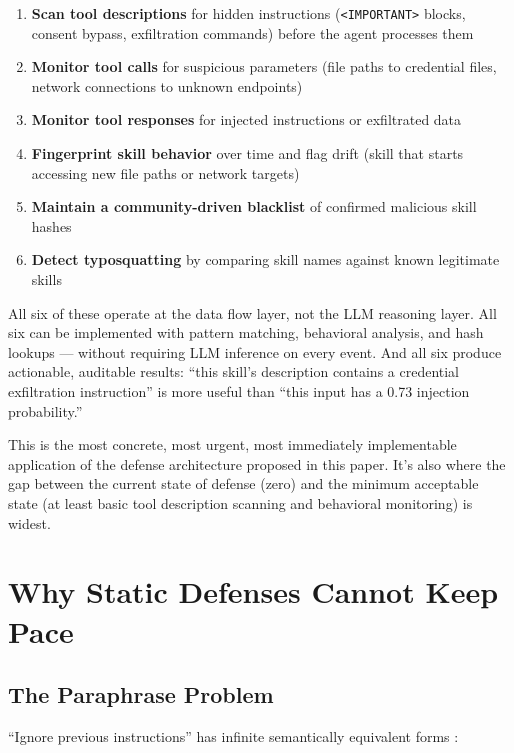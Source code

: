 \documentclass[11pt,letterpaper]{article}
\begin{document}
\begin{enumerate}
\item \textbf{Scan tool descriptions} for hidden instructions (\texttt{<IMPORTANT>} blocks, consent bypass, exfiltration commands) before the agent processes them
\item \textbf{Monitor tool calls} for suspicious parameters (file paths to credential files, network connections to unknown endpoints)
\item \textbf{Monitor tool responses} for injected instructions or exfiltrated data
\item \textbf{Fingerprint skill behavior} over time and flag drift (skill that starts accessing new file paths or network targets)
\item \textbf{Maintain a community-driven blacklist} of confirmed malicious skill hashes
\item \textbf{Detect typosquatting} by comparing skill names against known legitimate skills
\end{enumerate}

All six of these operate at the data flow layer, not the LLM reasoning layer. All six can be implemented with pattern matching, behavioral analysis, and hash lookups --- without requiring LLM inference on every event. And all six produce actionable, auditable results: ``this skill's description contains a credential exfiltration instruction'' is more useful than ``this input has a 0.73 injection probability.''

This is the most concrete, most urgent, most immediately implementable application of the defense architecture proposed in this paper. It's also where the gap between the current state of defense (zero) and the minimum acceptable state (at least basic tool description scanning and behavioral monitoring) is widest.


\section{Why Static Defenses Cannot Keep Pace}
\label{sec:staticdefense}

\subsection{The Paraphrase Problem}

``Ignore previous instructions'' has infinite semantically equivalent forms \cite{hacka,promptinjsurvey}:
\end{document}
